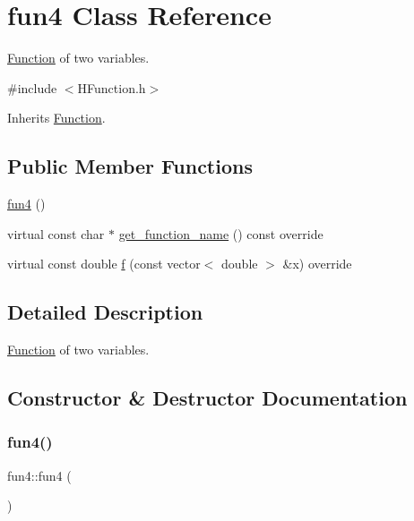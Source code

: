 \hypertarget{classfun4}{}\section{fun4 Class Reference}
\label{classfun4}


\hyperlink{class_function}{Function} of two variables.  




{\ttfamily \#include $<$H\+Function.\+h$>$}



Inherits \hyperlink{class_function}{Function}.

\subsection*{Public Member Functions}
\begin{DoxyCompactItemize}
\item 
\hyperlink{classfun4_a2161456b84376ff65bb7ceafde2adb3d}{fun4} ()
\item 
virtual const char $\ast$ \hyperlink{classfun4_a8f28df4800e2e572cf60d2d02e299100}{get\+\_\+function\+\_\+name} () const override
\item 
virtual const double \hyperlink{classfun4_a3b693cb223f26fb733381d601751eb5c}{f} (const vector$<$ double $>$ \&x) override
\end{DoxyCompactItemize}


\subsection{Detailed Description}
\hyperlink{class_function}{Function} of two variables. 

\subsection{Constructor \& Destructor Documentation}
\mbox{\label{classfun4_a2161456b84376ff65bb7ceafde2adb3d}} 
\subsubsection{\texorpdfstring{fun4()}{fun4()}}
{\footnotesize\ttfamily fun4\+::fun4 (\begin{DoxyParamCaption}{ }\end{DoxyParamCaption})}



